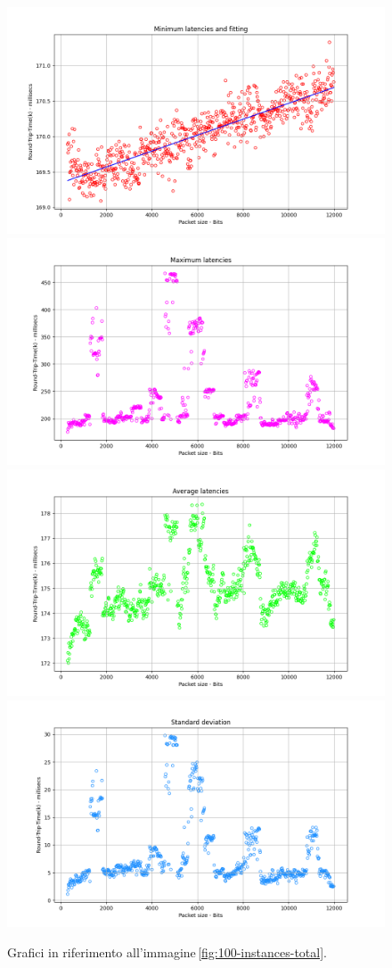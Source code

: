 \begin{figure}[h]
    \centering
    \includegraphics[width = .49\textwidth]{hw-2/report/imgs/100-instances/la-min-latencies.png}
    \includegraphics[width = .49\textwidth]{hw-2/report/imgs/100-instances/la-max-latencies.png}
    \includegraphics[width = .49\textwidth]{hw-2/report/imgs/100-instances/la-avg-latencies.png}
    \includegraphics[width = .49\textwidth]{hw-2/report/imgs/100-instances/la-standard-deviation.png}
    \caption{Grafici in riferimento all'immagine\,\ref{fig:100-instances-total}.}
    \label{fig:100-instances-stats}
\end{figure}

